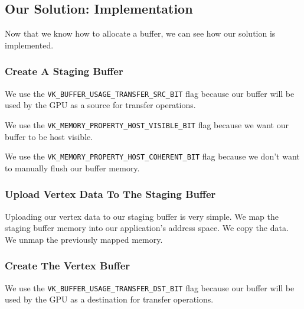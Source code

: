 \subsection{Our Solution: Implementation}

Now that we know how to allocate a buffer, we can see how our solution
is implemented.

\subsubsection{Create A Staging Buffer}

We use the \texttt{VK\_BUFFER\_USAGE\_TRANSFER\_SRC\_BIT} flag
because our buffer will be used by the GPU as a source for
transfer operations.

We use the \texttt{VK\_MEMORY\_PROPERTY\_HOST\_VISIBLE\_BIT} flag
because we want our buffer to be host visible.

We use the \texttt{VK\_MEMORY\_PROPERTY\_HOST\_COHERENT\_BIT} flag
because we don't want to manually flush our buffer memory.

\begin{minipage}{\linewidth}{\noindent}
    
\end{minipage}

\subsubsection{Upload Vertex Data To The Staging Buffer}

Uploading our vertex data to our staging buffer is very simple.
We map the staging buffer memory into our application's address space.
We copy the data.
We unmap the previously mapped memory.

\begin{minipage}{\linewidth}{\noindent}
    
\end{minipage}

\subsubsection{Create The Vertex Buffer}

We use the \texttt{VK\_BUFFER\_USAGE\_TRANSFER\_DST\_BIT} flag
because our buffer will be used by the GPU as a destination for
transfer operations.

